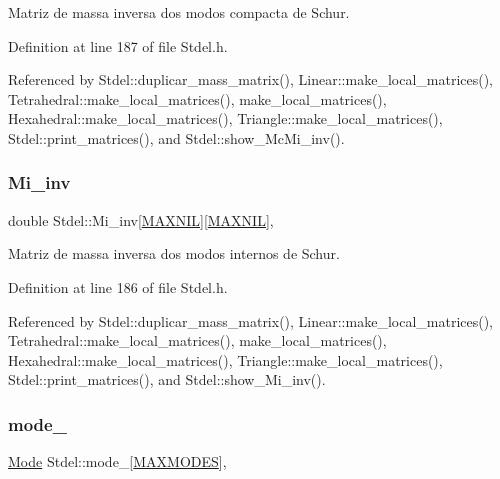 Matriz de massa inversa dos modos compacta de Schur. 



Definition at line 187 of file Stdel.\+h.



Referenced by Stdel\+::duplicar\+\_\+mass\+\_\+matrix(), Linear\+::make\+\_\+local\+\_\+matrices(), Tetrahedral\+::make\+\_\+local\+\_\+matrices(), make\+\_\+local\+\_\+matrices(), Hexahedral\+::make\+\_\+local\+\_\+matrices(), Triangle\+::make\+\_\+local\+\_\+matrices(), Stdel\+::print\+\_\+matrices(), and Stdel\+::show\+\_\+\+Mc\+Mi\+\_\+inv().

\mbox{\label{classStdel_a53a9490d5a02a96473d96848bac3711a}} 
\subsubsection{\texorpdfstring{Mi\+\_\+inv}{Mi\_inv}}
{\footnotesize\ttfamily double Stdel\+::\+Mi\+\_\+inv\mbox{[}\hyperlink{MyOptions_8h_a463cdf068fb6289d1f81dac7e0f76ab5}{M\+A\+X\+N\+IL}\mbox{]}\mbox{[}\hyperlink{MyOptions_8h_a463cdf068fb6289d1f81dac7e0f76ab5}{M\+A\+X\+N\+IL}\mbox{]}\hspace{0.3cm}{\ttfamily [protected]}, {\ttfamily [inherited]}}



Matriz de massa inversa dos modos internos de Schur. 



Definition at line 186 of file Stdel.\+h.



Referenced by Stdel\+::duplicar\+\_\+mass\+\_\+matrix(), Linear\+::make\+\_\+local\+\_\+matrices(), Tetrahedral\+::make\+\_\+local\+\_\+matrices(), make\+\_\+local\+\_\+matrices(), Hexahedral\+::make\+\_\+local\+\_\+matrices(), Triangle\+::make\+\_\+local\+\_\+matrices(), Stdel\+::print\+\_\+matrices(), and Stdel\+::show\+\_\+\+Mi\+\_\+inv().

\mbox{\label{classStdel_a7a09cf048f14496813a914ca6afe7366}} 
\subsubsection{\texorpdfstring{mode\+\_\+}{mode\_}}
{\footnotesize\ttfamily \hyperlink{classMode}{Mode} Stdel\+::mode\+\_\+\mbox{[}\hyperlink{MyOptions_8h_aa75ccd382acf88cec3e9c8025c1f88b7}{M\+A\+X\+M\+O\+D\+ES}\mbox{]}\hspace{0.3cm}{\ttfamily [protected]}, {\ttfamily [inherited]}}



